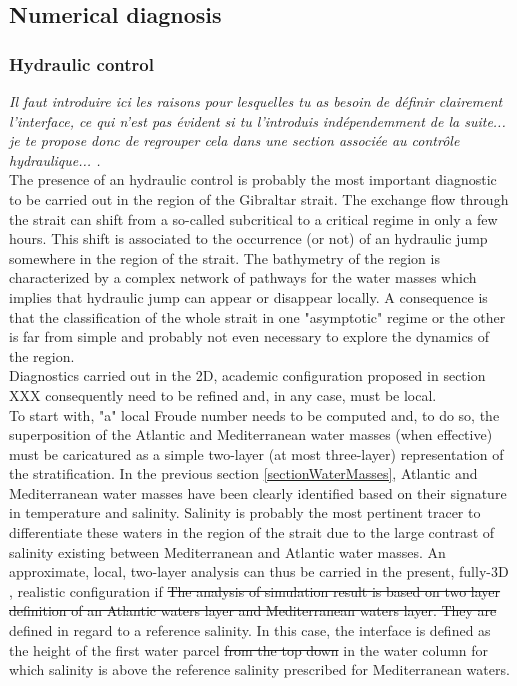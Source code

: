 \subsection{Numerical diagnosis}
\label{PartDiag3D}

\subsubsection{Hydraulic control}
\color{green} 
\textit{Il faut introduire ici les raisons pour lesquelles tu as besoin de définir clairement l'interface, ce qui n'est pas évident si tu l'introduis indépendemment de la suite... je te propose donc de regrouper cela dans une section associée au contrôle hydraulique... .} \color{black}\\

\color{blue}The presence of an hydraulic control is probably the most important diagnostic to be carried out in the region of the Gibraltar strait. The exchange flow through the strait can shift from a so-called subcritical to a critical regime in only a few hours. This shift is associated to the occurrence (or not) of an hydraulic jump somewhere in the region of the strait. The bathymetry of the region is characterized by a complex network of pathways for the water masses which implies that hydraulic jump can appear or disappear locally. A consequence is that the classification of the whole strait in one "asymptotic" regime or the other is far from simple and probably not even necessary to explore the dynamics of the region.\\
Diagnostics carried out in the 2D, academic configuration proposed in section {XXX} consequently need to be refined and, in any case, must be local.\\
To start with, "a" local Froude number needs to be computed and, to do so,  the superposition of the Atlantic and Mediterranean water masses (when effective) must be caricatured as a simple two-layer (at most three-layer) representation of the stratification.
In the previous section \ref{sectionWaterMasses}, Atlantic and Mediterranean water masses have been clearly identified based on their signature in temperature and salinity. Salinity is probably the most pertinent tracer to differentiate these waters in the region of the strait due to the large contrast of salinity existing between Mediterranean and Atlantic water masses.
An approximate, local, two-layer analysis can thus be carried in the present, fully-3D , realistic configuration if
\color{black}
\sout{The analysis of simulation result is based on two layer definition of an Atlantic waters layer and Mediterranean waters layer. They are} defined in regard to a reference salinity. In this case, the interface is defined as the height of the first water parcel \sout{from the top down} in the water column for which salinity is above the reference salinity prescribed for Mediterranean waters.

